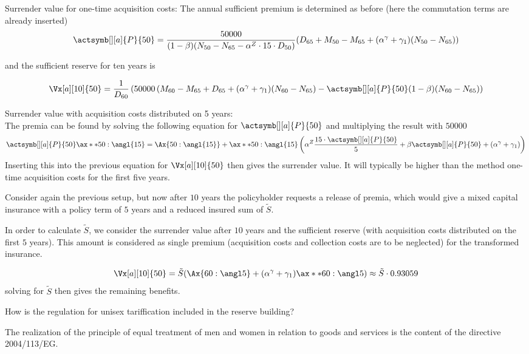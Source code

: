 \documentclass[11pt,a4paper,twoside]{article}
\begin{document}
Surrender value for one-time acquisition costs:
The annual sufficient premium is determined as before (here the commutation terms are already inserted)
\[
  \actsymb[][a]{P}{50} = \frac{50000}{(1 - \beta)(N_{50} - N_{65} - \alpha^Z \cdot 15 \cdot D_{50})}(D_{65} + M_{50} - M_{65} + (\alpha^\gamma + \gamma_1)(N_{50} - N_{65}))
\]

and the sufficient reserve for ten years is

\[
  \Vx[a][10]{50} = \frac{1}{D_{60}}\left(50000 \left(M_{60} - M_{65} + D_{65} + (\alpha^\gamma + \gamma_1)(N_{60} - N_{65}) -   \actsymb[][a]{P}{50}(1 - \beta)(N_{60} - N_{65} \right) \right)
\]


Surrender value with acquisition costs distributed on 5 years: \\

The premia can be found by solving the following equation for \( \actsymb[][a]{P}{50} \) and multiplying the result with \( 50000 \)
\[
  \actsymb[][a]{P}{50} \ax**{50:\angl{15}} = \Ax{50:\angl{15}} + \ax**{50:\angl{15}} \left(\alpha^Z \frac{15 \cdot \actsymb[][a]{P}{50}}{5}  + \beta \actsymb[][a]{P}{50} + (\alpha^\gamma + \gamma_1) \right)
\]
Inserting this into the previous equation for \(   \Vx[a][10]{50} \) then gives the surrender value. It will typically be higher than the method one-time acquisition costs
for the first five years.


Consider again the previous setup, but now after \( 10 \) years the policyholder requests a release of premia, which would give a mixed
capital insurance with a policy term of \( 5 \) years and a reduced insured sum of \( \tilde{S} \).

In order to calculate \( \tilde{S} \), we consider the surrender value after \( 10 \) years and the sufficient
reserve (with acquisition costs distributed on the first \( 5 \) years).
This amount is considered as single premium (acquisition costs and collection costs are to
be neglected) for the transformed insurance.

\[ 
  \Vx[a][10]{50} = \tilde{S}( \Ax{60:\angl 5} + (\alpha^\gamma + \gamma_1) \ax**{60:\angl 5}) \approx \tilde{S} \cdot 0.93059
\]
solving for \( \tilde{S} \) then gives the remaining benefits.


How is the regulation for unisex tariffication included in the reserve building?

The realization of the principle of equal treatment of men and women in relation to goods
and services is the content of the directive 2004/113/EG.
\end{document}
